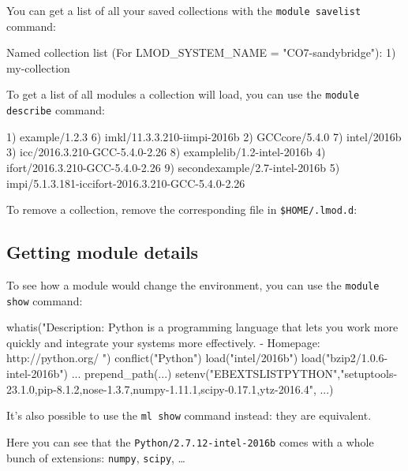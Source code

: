 You can get a list of all your saved collections with the \lstinline|module savelist|
command:

\begin{prompt}
Named collection list (For LMOD_SYSTEM_NAME = "CO7-sandybridge"):
  1) my-collection
\end{prompt}

To get a list of all modules a collection will load, you can use the \lstinline|module describe|
command:
\begin{prompt}
1) example/1.2.3                                          6) imkl/11.3.3.210-iimpi-2016b
2) GCCcore/5.4.0                                          7) intel/2016b
3) icc/2016.3.210-GCC-5.4.0-2.26                          8) examplelib/1.2-intel-2016b
4) ifort/2016.3.210-GCC-5.4.0-2.26                        9) secondexample/2.7-intel-2016b
5) impi/5.1.3.181-iccifort-2016.3.210-GCC-5.4.0-2.26
\end{prompt}
\fi

To remove a collection, remove the corresponding file in \lstinline|$HOME/.lmod.d|:

\begin{prompt}
\end{prompt}

\subsection{Getting module details}

To see how a module would change the environment, you can use the \lstinline|module show| command:

\ifusinglmod

\begin{prompt}
whatis("Description: Python is a programming language that lets you work more quickly and integrate your systems  more effectively. - Homepage: http://python.org/ ")
conflict("Python")
load("intel/2016b")
load("bzip2/1.0.6-intel-2016b")
...
prepend_path(...)
setenv("EBEXTSLISTPYTHON","setuptools-23.1.0,pip-8.1.2,nose-1.3.7,numpy-1.11.1,scipy-0.17.1,ytz-2016.4", ...)
\end{prompt}


It's also possible to use the \lstinline|ml show| command instead: they are equivalent.

Here you can see that the \lstinline|Python/2.7.12-intel-2016b| comes with a whole
bunch of extensions: \lstinline|numpy|, \lstinline|scipy|, \ldots

